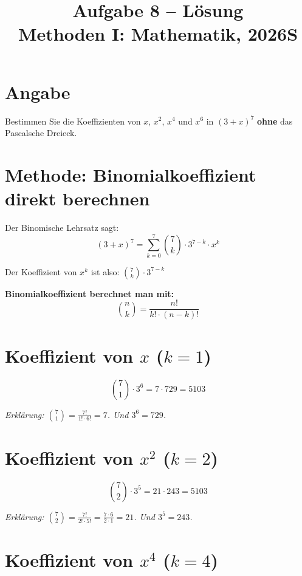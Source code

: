 \documentclass[12pt, a4paper]{article}
\title{\textbf{Aufgabe 8 -- Lösung} \\ Methoden I: Mathematik, 2026S}
\author{}
\date{}
\begin{document}
\maketitle

\section*{Angabe}
Bestimmen Sie die Koeffizienten von $x$, $x^2$, $x^4$ und $x^6$ in $(3 + x)^7$ \textbf{ohne} das Pascalsche Dreieck.

\section*{Methode: Binomialkoeffizient direkt berechnen}

Der Binomische Lehrsatz sagt:
\[
    (3 + x)^7 = \sum_{k=0}^{7} \binom{7}{k} \cdot 3^{7-k} \cdot x^k
\]

Der Koeffizient von $x^k$ ist also: $\binom{7}{k} \cdot 3^{7-k}$

\textbf{Binomialkoeffizient berechnet man mit:}
\[
    \binom{n}{k} = \frac{n!}{k! \cdot (n-k)!}
\]

\section*{Koeffizient von $x$ ($k = 1$)}

\[
    \binom{7}{1} \cdot 3^{6} = 7 \cdot 729 = \boxed{5103}
\]

\textit{Erklärung: $\binom{7}{1} = \frac{7!}{1! \cdot 6!} = 7$. Und $3^6 = 729$.}

\section*{Koeffizient von $x^2$ ($k = 2$)}

\[
    \binom{7}{2} \cdot 3^{5} = 21 \cdot 243 = \boxed{5103}
\]

\textit{Erklärung: $\binom{7}{2} = \frac{7!}{2! \cdot 5!} = \frac{7 \cdot 6}{2 \cdot 1} = 21$. Und $3^5 = 243$.}

\section*{Koeffizient von $x^4$ ($k = 4$)}
\end{document}
